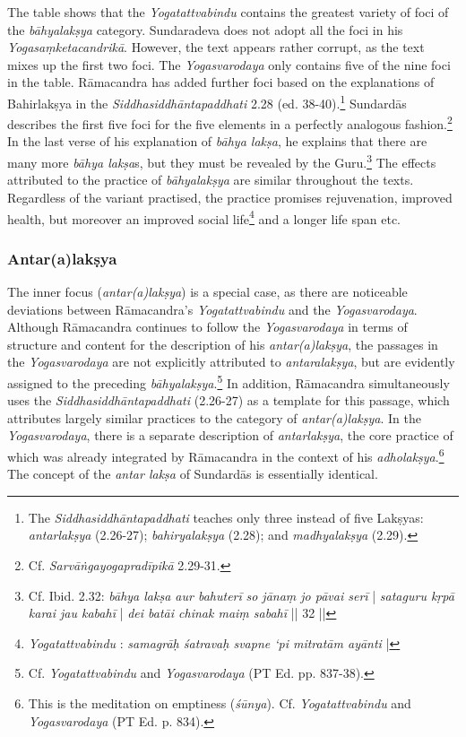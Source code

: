  The table shows that the \textit{Yogatattvabindu} contains the greatest variety of foci of the \textit{bāhyalakṣya} category. Sundaradeva does not adopt all the foci in his \textit{Yogasaṃketacandrikā}. However, the text appears rather corrupt, as the text mixes up the first two foci. The \textit{Yogasvarodaya} only contains five of the nine foci in the table. Rāmacandra has added further foci based on the explanations of Bahirlakṣya in the \textit{Siddhasiddhāntapaddhati} 2.28 (ed. 38-40).\footnote{The \textit{Siddhasiddhāntapaddhati} teaches only three instead of five Lakṣyas: \textit{antarlakṣya} (2.26-27); \textit{bahiryalakṣya} (2.28); and \textit{madhyalakṣya} (2.29).} Sundardās describes the first five foci for the five elements in a perfectly analogous fashion.\footnote{Cf. \textit{Sarvāṅgayogapradīpikā} 2.29-31.} In the last verse of his explanation of \textit{bāhya lakṣa}, he explains that there are many more \textit{bāhya lakṣa}s, but they must be revealed by the Guru.\footnote{Cf. Ibid. 2.32: \textit{bāhya lakṣa aur bahuterī} \textit{so jānaṃ jo pāvai serī} | \textit{sataguru kṛpā karai jau kabahī} | \textit{dei batāi chinak maiṃ sabahī} || 32 ||}
The effects attributed to the practice of \textit{bāhyalakṣya} are similar throughout the texts. Regardless of the variant practised, the practice promises rejuvenation, improved health, but moreover an improved social life\footnote{\textit{Yogatattvabindu} : \textit{samagrāḥ śatravaḥ svapne ‘pi mitratām ayānti} |} and a longer life span etc. 

\subsubsection{Antar(a)lakṣya}
The inner focus (\textit{antar(a)lakṣya}) is a special case, as there are noticeable deviations between Rāmacandra’s \textit{Yogatattvabindu} and the \textit{Yogasvarodaya}. Although Rāmacandra continues to follow the \textit{Yogasvarodaya} in terms of structure and content for the description of his \textit{antar(a)lakṣya}, the passages in the \textit{Yogasvarodaya} are not explicitly attributed to \textit{antaralakṣya}, but are evidently assigned to the preceding \textit{bāhyalakṣya}.\footnote{Cf. \textit{Yogatattvabindu}  and \textit{Yogasvarodaya} (PT Ed. pp. 837-38).} In addition, Rāmacandra simultaneously uses the \textit{Siddhasiddhāntapaddhati} (2.26-27) as a template for this passage, which attributes largely similar practices to the category of \textit{antar(a)lakṣya}. In the \textit{Yogasvarodaya}, there is a separate description of \textit{antarlakṣya}, the core practice of which was already integrated by Rāmacandra in the context of his \textit{adholakṣya}.\footnote{This is the meditation on emptiness (\textit{śūnya}). Cf. \textit{Yogatattvabindu}  and \textit{Yogasvarodaya} (PT Ed. p. 834).} 
The concept of the \textit{antar lakṣa} of Sundardās is essentially identical.

